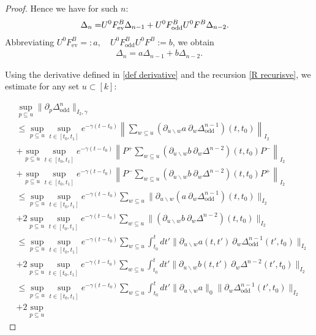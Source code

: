 \documentclass[b5paper,draft,openbib,12pt]{memoir}
\DeclareMathOperator{\ev}{ev}
\DeclareMathOperator{\odd}{odd}
\begin{document}
\begin{proof}
Hence we have for such \(n\):
\begin{align}\notag
  \Delta_{n}=&U^0F^B_{\ev}\Delta_{n-1}
  +U^0F^B_{\odd} U^0F^B \Delta_{n-2}.
\end{align}
Abbreviating \(U^0F^B_{\ev}=:a,\quad U^0F^B_{\odd}U^0 F^B:=b\), we obtain
\begin{align}\label{R recurisve}
  \Delta_{n}=a\Delta_{n-1}
  +b \Delta_{n-2}.
\end{align}

Using the derivative defined in 
\eqref{def derivative} and the recursion 
\eqref{R recurisve},
we estimate for any set \(u\subset [k]\):

\begin{align}
&\sup_{p\subseteq u}\|\partial_p \Delta^n_{\odd} \|_{I_2,\gamma}\\
&\le \sup_{p\subseteq u} \sup_{t\in[t_0,t_1]} e^{-\gamma(t-t_0)}
\left\| \sum_{w\subseteq u} (\partial_{u\backslash w}a ~
\partial_w \Delta^{n-1}_{\odd})(t,t_0)\right\|_{I_2}\\
&+\sup_{p\subseteq u} \sup_{t\in[t_0,t_1]} e^{-\gamma(t-t_0)}
\left\|P^+ \sum_{w\subseteq u} (\partial_{u\backslash w}b ~
\partial_w \Delta^{n-2})(t,t_0) P^-\right\|_{I_2}\\
&+\sup_{p\subseteq u} \sup_{t\in[t_0,t_1]} e^{-\gamma(t-t_0)}
\left\|P^- \sum_{w\subseteq u} (\partial_{u\backslash w}b ~
\partial_w \Delta^{n-2})(t,t_0) P^+\right\|_{I_2}\\
&\le 
\sup_{p\subseteq u} \sup_{t\in[t_0,t_1]} e^{-\gamma(t-t_0)} 
\sum_{w\subseteq u} 
\| \partial_{u\backslash w}(a ~
\partial_w \Delta^{n-1}_{\odd})(t,t_0)\|_{I_2}\\
&+2\sup_{p\subseteq u} \sup_{t\in[t_0,t_1]} 
e^{-\gamma(t-t_0)} \sum_{w\subseteq u} 
\|  (\partial_{u\backslash w}b ~
\partial_w \Delta^{n-2})(t,t_0) \|_{I_2}\\
&\le
\sup_{p\subseteq u}\sup_{t\in[t_0,t_1]} e^{-\gamma(t-t_0)} 
\sum_{w\subseteq u} 
\int_{t_0}^{t}dt' 
\| \partial_{u\backslash w}a(t,t') ~
\partial_w \Delta^{n-1}_{\odd}(t',t_0)\|_{I_2}\\
&+2 \sup_{p\subseteq u}
\sup_{t\in[t_0,t_1]} e^{-\gamma(t-t_0)}\sum_{w\subseteq u} 
\int_{t_0}^{t}dt'  
\|  \partial_{u\backslash w}b(t,t') ~
\partial_w \Delta^{n-2}(t',t_0) \|_{I_2}\\
&\le
\sup_{p\subseteq u}\sup_{t\in[t_0,t_1]} 
e^{-\gamma(t-t_0)} \sum_{w\subseteq u} 
\int_{t_0}^{t}dt' 
\| \partial_{u\backslash w}a\|_{0}
\|\partial_w \Delta^{n-1}_{\odd}(t',t_0)\|_{I_2}\\
&+2 \sup_{p\subseteq u}

\end{align}
\end{proof}
\end{document}
